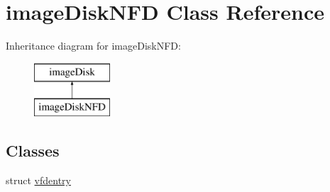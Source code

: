 \hypertarget{classimageDiskNFD}{\section{image\-Disk\-N\-F\-D Class Reference}
\label{classimageDiskNFD}
}
Inheritance diagram for image\-Disk\-N\-F\-D\-:\begin{figure}[H]
\begin{center}
\leavevmode
\includegraphics[height=2.000000cm]{classimageDiskNFD}
\end{center}
\end{figure}
\subsection*{Classes}
\begin{DoxyCompactItemize}
\item 
struct \hyperlink{structimageDiskNFD_1_1vfdentry}{vfdentry}
\end{DoxyCompactItemize}
